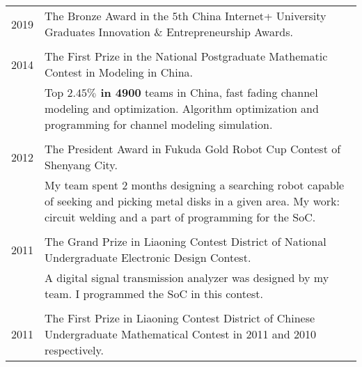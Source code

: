 \documentclass[a4paper,10pt]{article}
\begin{document}
\begin{longtable}[H]{r|p{13.5cm}}
  \hspace{20pt} \textsc{2019} & The Bronze Award in the $5$th China Internet+ University Graduates Innovation \& Entrepreneurship Awards. \\
  \multicolumn{2}{c}{} \\
  \textsc{2014} & The First Prize in the National Postgraduate Mathematic Contest in Modeling in China.\\
                              & Top \textbf{$\mathbf{2.45\%}$ in 4900} teams in China, fast fading channel modeling and optimization. Algorithm optimization and programming for channel modeling simulation.\\
  \multicolumn{2}{c}{} \\

  \textsc{2012} & The President Award in Fukuda Gold Robot Cup Contest of Shenyang City. \\
                              & My team spent 2 months designing a searching robot capable of seeking and picking metal disks in a given area. My work: circuit welding and a part of programming for the SoC. \\
  \multicolumn{2}{c}{} \\

  \textsc{2011} & The Grand Prize in Liaoning Contest District of National Undergraduate Electronic Design Contest. \\
                              & A digital signal transmission analyzer was designed by my team. I programmed the SoC in this contest.\\
  \multicolumn{2}{c}{} \\

  \textsc{2011} & The First Prize in Liaoning Contest District of Chinese Undergraduate Mathematical Contest in 2011 and
                  2010 respectively. \\
\end{longtable}
\end{document}
